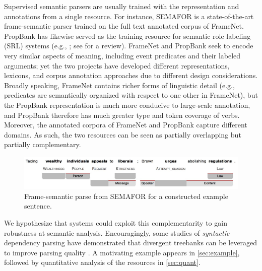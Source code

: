 \documentclass[11pt]{article}
\begin{document}
Supervised semantic parsers are usually trained with the representation and annotations from a single resource. 
For instance, SEMAFOR \citep{semafor,semafor-14} is a state-of-the-art frame-semantic parser
trained on the full text annotated corpus of FrameNet. 
PropBank has likewise served as the training resource for semantic role labeling (SRL) systems (e.g., \citealp{illinoisSRL}; see \citealp{palmer-10} for a review). 
FrameNet and PropBank seek to encode very similar aspects of meaning, including event predicates 
and their labeled arguments; yet the two projects have developed different representations, lexicons, 
and corpus annotation approaches due to different design considerations.
Broadly speaking, FrameNet contains richer forms of linguistic detail (e.g., predicates are semantically organized 
with respect to one other in FrameNet), but the PropBank representation is much more conducive to large-scale annotation, 
and PropBank therefore has much greater type and token coverage of verbs.
Moreover, the annotated corpora of FrameNet and PropBank capture different domains.
As such, the two resources can be seen as partially overlapping but partially complementary.

\begin{figure}\centering
\includegraphics[width=.8\textwidth]{tax_example_short.jpg}
\caption{Frame-semantic parse from SEMAFOR for a constructed example sentence.}
\label{fig:semaforOutput}
\end{figure}


We hypothesize that systems could exploit this complementarity to gain robustness at semantic analysis. 
Encouragingly, some studies of \emph{syntactic} dependency parsing have demonstrated that divergent treebanks can be leveraged 
to improve parsing quality \citep{zhou:2013,johansson-13}.
A motivating example appears in \cref{sec:example}, followed by quantitative analysis of the resources in \cref{sec:quant}.
\end{document}
